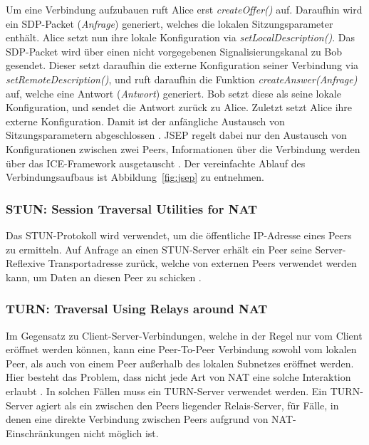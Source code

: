 Um eine Verbindung aufzubauen ruft Alice erst \textit{createOffer()} auf. Daraufhin wird ein SDP-Packet (\textit{Anfrage}) generiert, welches die lokalen Sitzungsparameter enthält. Alice setzt nun ihre lokale Konfiguration via \textit{setLocalDescription()}. Das \acs{SDP}-Packet wird über einen nicht vorgegebenen Signalisierungskanal zu Bob gesendet. Dieser setzt daraufhin die externe Konfiguration seiner Verbindung via \textit{setRemoteDescription()}, und ruft daraufhin die Funktion \textit{createAnswer(Anfrage)} auf, welche eine Antwort (\textit{Antwort}) generiert. Bob setzt diese als seine lokale Konfiguration, und sendet die Antwort zurück zu Alice. Zuletzt setzt Alice ihre externe Konfiguration. Damit ist der anfängliche Austausch von Sitzungsparametern abgeschlossen \cite{altanai2014}. \acs{JSEP} regelt dabei nur den Austausch von Konfigurationen zwischen zwei Peers, Informationen über die Verbindung werden über das \acs{ICE}-Framework ausgetauscht \cite{loreto2014, rtcconnectivity}. Der vereinfachte Ablauf des Verbindungsaufbaus ist Abbildung~\ref{fig:jsep} zu entnehmen.

\subsubsection{STUN: Session Traversal Utilities for NAT}
Das \acf{STUN}-Protokoll wird verwendet, um die öffentliche \acs{IP}-Adresse eines Peers zu ermitteln. Auf Anfrage an einen STUN-Server erhält ein Peer seine Server-Reflexive Transportadresse zurück, welche von externen Peers verwendet werden kann, um Daten an diesen Peer zu schicken \cite{stunRFC}.\par

\subsubsection{TURN: Traversal Using Relays around NAT}
Im Gegensatz zu Client-Server-Verbindungen, welche in der Regel nur vom Client eröffnet werden können, kann eine Peer-To-Peer Verbindung sowohl vom lokalen Peer, als auch von einem Peer außerhalb des lokalen Subnetzes eröffnet werden. Hier besteht das Problem, dass nicht jede Art von \acs{NAT} eine solche Interaktion erlaubt \cite{natproblemsRFC}. In solchen Fällen muss ein \acf{TURN}-Server verwendet werden. Ein \acs{TURN}-Server agiert als ein zwischen den Peers liegender Relais-Server, für Fälle, in denen eine direkte Verbindung zwischen Peers aufgrund von \acs{NAT}-Einschränkungen nicht möglich ist.

